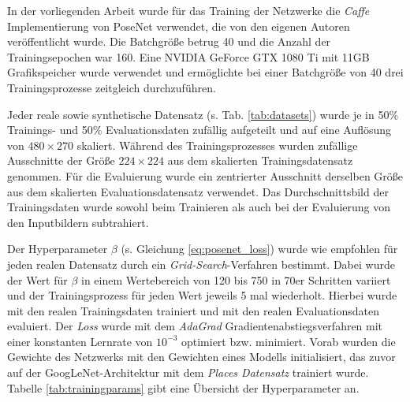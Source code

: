 

In der vorliegenden Arbeit wurde für das Training der Netzwerke die \textit{Caffe} \cite{jiaCaffeConvolutionalArchitecture2014} Implementierung von PoseNet verwendet, die von den eigenen Autoren \citet{kendallPoseNetConvolutionalNetwork2015} veröffentlicht wurde. Die Batchgröße betrug 40 und die Anzahl der Trainingsepochen war 160. Eine NVIDIA GeForce GTX 1080 Ti mit 11GB Grafikspeicher wurde verwendet und ermöglichte bei einer Batchgröße von 40 drei Trainingsprozesse zeitgleich durchzuführen.

Jeder reale sowie synthetische Datensatz (s. Tab. \ref{tab:datasets}) wurde je in 50\% Trainings- und 50\% Evaluationsdaten zufällig aufgeteilt und auf eine Auflösung von $480\times270$ skaliert. Während des Trainingsprozesses wurden zufällige Ausschnitte der Größe $224 \times 224$ aus dem skalierten Trainingsdatensatz genommen. Für die Evaluierung wurde ein zentrierter Ausschnitt derselben Größe aus dem skalierten Evaluationsdatensatz verwendet. Das Durchschnittsbild der Trainingsdaten wurde sowohl beim Trainieren als auch bei der Evaluierung von den Inputbildern subtrahiert. 

Der Hyperparameter $\beta$ (s. Gleichung \ref{eq:posenet_loss}) wurde wie empfohlen für jeden realen Datensatz durch ein \textit{Grid-Search}-Verfahren bestimmt. Dabei wurde der Wert für $\beta$ in einem Wertebereich von 120 bis 750 in 70er Schritten variiert und der Trainingsprozess für jeden Wert jeweils 5 mal wiederholt. Hierbei wurde mit den realen Trainingsdaten trainiert und mit den realen Evaluationsdaten evaluiert. Der \textit{Loss} wurde mit dem \textit{AdaGrad} \cite{duchiAdaptiveSubgradientMethods2011} Gradientenabstiegsverfahren mit einer konstanten Lernrate von $10^{-3}$ optimiert bzw. minimiert. Vorab wurden die Gewichte des Netzwerks mit den Gewichten eines Modells initialisiert, das zuvor auf der GoogLeNet-Architektur mit dem \textit{Places Datensatz} trainiert wurde. Tabelle \ref{tab:trainingparams} gibt eine Übersicht der Hyperparameter an.

